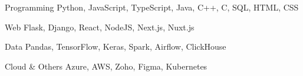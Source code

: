 
\begin{cvskills}

  \cvskill
    {Programming} %
    {Python, JavaScript, TypeScript, Java, C++, C, SQL, HTML, CSS} %

  \cvskill
    {Web} %
    {Flask, Django, React, NodeJS, Next.js, Nuxt.js} %

  \cvskill
    {Data} %
    {Pandas, TensorFlow, Keras, Spark, Airflow, ClickHouse} %

  \cvskill
    {Cloud \& Others} %
    {Azure, AWS, Zoho, Figma, Kubernetes} %

\end{cvskills}